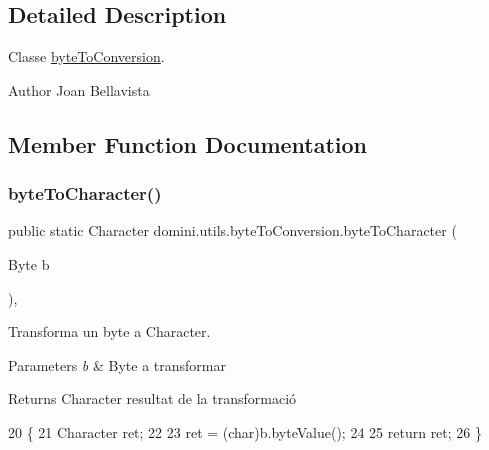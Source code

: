 \subsection{Detailed Description}
Classe \hyperlink{classdomini_1_1utils_1_1byteToConversion}{byte\+To\+Conversion}. 

\begin{DoxyAuthor}{Author}
Joan Bellavista 
\end{DoxyAuthor}


\subsection{Member Function Documentation}
\mbox{\label{classdomini_1_1utils_1_1byteToConversion_a5d2f5f8de52e4001cf6698ca03fe31e8}} 
\subsubsection{\texorpdfstring{byte\+To\+Character()}{byteToCharacter()}}
{\footnotesize\ttfamily public static Character domini.\+utils.\+byte\+To\+Conversion.\+byte\+To\+Character (\begin{DoxyParamCaption}\item[{Byte}]{b }\end{DoxyParamCaption})\hspace{0.3cm}{\ttfamily [inline]}, {\ttfamily [static]}}



Transforma un byte a Character. 


\begin{DoxyParams}{Parameters}
{\em b} & Byte a transformar \\
\hline
\end{DoxyParams}
\begin{DoxyReturn}{Returns}
Character resultat de la transformació 
\end{DoxyReturn}

\begin{DoxyCode}
20     \{
21         Character ret;
22 
23         ret = (char)b.byteValue();
24 
25         \textcolor{keywordflow}{return} ret;
26     \}
\end{DoxyCode}
\mbox{\label{classdomini_1_1utils_1_1byteToConversion_a3242a47adade49b6cfa6a9232944f587}} 
